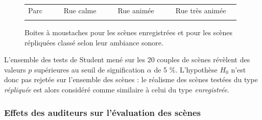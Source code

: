 \begin{figure}[ht]
\centering
{}

\begin{tabular}{|p{1.5cm}|l|p{0.001cm}|p{2cm}|l|p{0.001cm}|p{2cm}|l|p{0.001cm}|p{2.75cm}|l|}
\hhline{|-|-|~|-|-|~|-|-|~|-|-|}
Parc & {\cellcolor[HTML]{5AB25A}} & & Rue calme & {\cellcolor[HTML]{FFCB2F}} & & Rue animée & {\cellcolor[HTML]{F56B00}} & &  Rue très animée & {\cellcolor[HTML]{9A0000}}\\
\hhline{|-|-|~|-|-|~|-|-|~|-|-|}
\end{tabular}

\caption{Boites à moustaches pour les scènes enregistrées   et pour les scènes répliquées  classé selon leur ambiance sonore.}

\label{fig:boxplot_scene}
\end{figure}

L'ensemble des tests de Student mené sur les 20 couples de scènes révèlent des valeurs $p$ supérieures au seuil de signification $\alpha$ de 5 $\%$. L'hypothèse $H_0$ n'est donc pas rejetée sur l'ensemble des scènes : le réalisme des scènes testées du type \textit{répliquée} est alors considéré comme similaire à celui du type \textit{enregistrée}.


\subsubsection{Effets des auditeurs sur l'évaluation des scènes}

